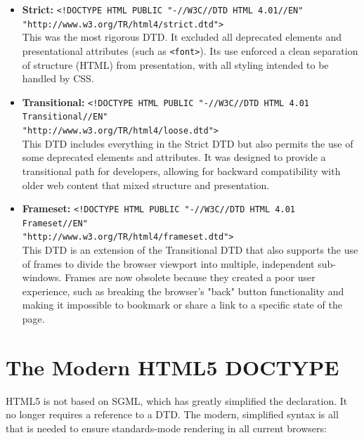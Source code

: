 \documentclass{scrbook}
\begin{document}
\begin{itemize}
    \item 
    \textbf{Strict:} \texttt{<!DOCTYPE HTML PUBLIC "-//W3C//DTD HTML 4.01//EN" \\ "http://www.w3.org/TR/html4/strict.dtd">} \\
    
    This was the most rigorous DTD. It excluded all deprecated elements and presentational attributes (such as \texttt{<font>}). Its use enforced a clean separation of structure (HTML) from presentation, with all styling intended to be handled by CSS.

    \item 
    \textbf{Transitional:} \texttt{<!DOCTYPE HTML PUBLIC "-//W3C//DTD HTML 4.01 Transitional//EN" \\ "http://www.w3.org/TR/html4/loose.dtd">} \\

    This DTD includes everything in the Strict DTD but also permits the use of some deprecated elements and attributes. It was designed to provide a transitional path for developers, allowing for backward compatibility with older web content that mixed structure and presentation.

    \item 
    \textbf{Frameset:} \texttt{<!DOCTYPE HTML PUBLIC "-//W3C//DTD HTML 4.01 Frameset//EN" \\ "http://www.w3.org/TR/html4/frameset.dtd">} \\

    This DTD is an extension of the Transitional DTD that also supports the use of frames to divide the browser viewport into multiple, independent sub-windows. Frames are now obsolete because they created a poor user experience, such as breaking the browser's "back" button functionality and making it impossible to bookmark or share a link to a specific state of the page.
\end{itemize}

\section{The Modern HTML5 DOCTYPE}

HTML5 is not based on SGML, which has greatly simplified the declaration. It no longer requires a reference to a DTD. The modern, simplified syntax is all that is needed to ensure standards-mode rendering in all current browsers: \\
\end{document}
